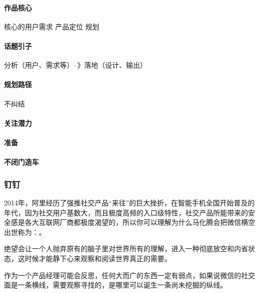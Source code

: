 \documentclass[letterpaper,11pt,english]{sphinxmanual}
\begin{document}
\paragraph{作品核心}
\label{\detokenize{chapter_experience/diudiu:id3}}
核心的用户需求 产品定位 规划


\paragraph{话题引子}
\label{\detokenize{chapter_experience/diudiu:id4}}
分析（用户、需求等）–》落地（设计、输出）


\paragraph{规划路径}
\label{\detokenize{chapter_experience/diudiu:id5}}
不纠结



\paragraph{关注潜力}
\label{\detokenize{chapter_experience/diudiu:id6}}

\paragraph{准备}
\label{\detokenize{chapter_experience/diudiu:id7}}

\paragraph{不闭门造车}
\label{\detokenize{chapter_experience/diudiu:id8}}

\subsubsection{钉钉}
\label{\detokenize{chapter_experience/dingding:id1}}\label{\detokenize{chapter_experience/dingding::doc}}
2014年，阿里经历了强推社交产品“来往”的巨大挫折，在智能手机全国开始普及的年代，因为社交用户基数大，而且极度高频的入口级特性，社交产品所能带来的安全感是各大互联网厂商都极度渴望的，所以你可以理解为什么马化腾会把微信横空出世称为：。

绝望会让一个人抛弃原有的脑子里对世界所有的理解，进入一种彻底放空和内省状态，这时候才能静下心来观察和阅读世界真正的需要。

作为一个产品经理可能会反思，任何大而广的东西一定有弱点，如果说微信的社交面是一条横线，需要观察寻找的，是哪里可以诞生一条尚未挖掘的纵线。
\end{document}
